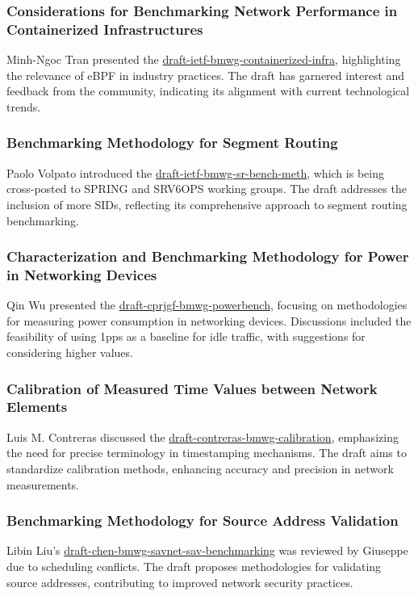 \documentclass{article}
\begin{document}
\subsubsection{Considerations for Benchmarking Network Performance in Containerized Infrastructures}
Minh-Ngoc Tran presented the \href{https://datatracker.ietf.org/doc/html/draft-ietf-bmwg-containerized-infra}{draft-ietf-bmwg-containerized-infra}, highlighting the relevance of eBPF in industry practices. The draft has garnered interest and feedback from the community, indicating its alignment with current technological trends.

\subsubsection{Benchmarking Methodology for Segment Routing}
Paolo Volpato introduced the \href{https://datatracker.ietf.org/doc/html/draft-ietf-bmwg-sr-bench-meth}{draft-ietf-bmwg-sr-bench-meth}, which is being cross-posted to SPRING and SRV6OPS working groups. The draft addresses the inclusion of more SIDs, reflecting its comprehensive approach to segment routing benchmarking.

\subsubsection{Characterization and Benchmarking Methodology for Power in Networking Devices}
Qin Wu presented the \href{https://datatracker.ietf.org/doc/html/draft-cprjgf-bmwg-powerbench}{draft-cprjgf-bmwg-powerbench}, focusing on methodologies for measuring power consumption in networking devices. Discussions included the feasibility of using 1pps as a baseline for idle traffic, with suggestions for considering higher values.

\subsubsection{Calibration of Measured Time Values between Network Elements}
Luis M. Contreras discussed the \href{https://datatracker.ietf.org/doc/html/draft-contreras-bmwg-calibration}{draft-contreras-bmwg-calibration}, emphasizing the need for precise terminology in timestamping mechanisms. The draft aims to standardize calibration methods, enhancing accuracy and precision in network measurements.

\subsubsection{Benchmarking Methodology for Source Address Validation}
Libin Liu's \href{https://datatracker.ietf.org/doc/html/draft-chen-bmwg-savnet-sav-benchmarking}{draft-chen-bmwg-savnet-sav-benchmarking} was reviewed by Giuseppe due to scheduling conflicts. The draft proposes methodologies for validating source addresses, contributing to improved network security practices.
\end{document}

